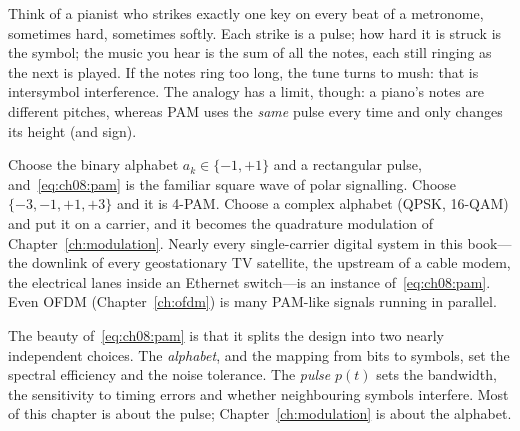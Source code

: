 \begin{analogy}
Think of a pianist who strikes exactly one key on every beat of a metronome, sometimes hard,
sometimes softly. Each strike is a pulse; how hard it is struck is the symbol; the music you
hear is the sum of all the notes, each still ringing as the next is played. If the notes ring
too long, the tune turns to mush: that is intersymbol interference. The analogy has a limit,
though: a piano's notes are different pitches, whereas PAM uses the \emph{same} pulse every
time and only changes its height (and sign).
\end{analogy}

Choose the binary alphabet $a_k\in\{-1,+1\}$ and a rectangular pulse, and~\eqref{eq:ch08:pam}
is the familiar square wave of polar signalling. Choose $\{-3,-1,+1,+3\}$ and it is 4-PAM.
Choose a complex alphabet (QPSK, 16-QAM) and put it on a carrier, and it becomes the
quadrature modulation of Chapter~\ref{ch:modulation}. Nearly every single-carrier digital
system in this book---the downlink of every geostationary TV satellite, the upstream of a
cable modem, the electrical lanes inside an Ethernet switch---is an instance
of~\eqref{eq:ch08:pam}. Even OFDM (Chapter~\ref{ch:ofdm}) is many PAM-like signals running in
parallel.

The beauty of~\eqref{eq:ch08:pam} is that it splits the design into two nearly independent
choices. The \emph{alphabet}, and the mapping from bits to symbols, set the spectral efficiency
and the noise tolerance. The \emph{pulse} $p(t)$ sets the bandwidth, the sensitivity to timing
errors and whether neighbouring symbols interfere. Most of this chapter is about the pulse;
Chapter~\ref{ch:modulation} is about the alphabet.

